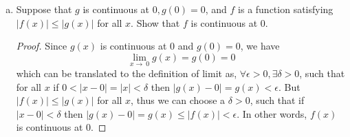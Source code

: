 \documentclass[10pt,letterpaper]{article}
\begin{document}
\begin{enumerate}[(a)]
	\item Suppose that $g$ is continuous at $0, g(0) = 0$, and $f$ is a function satisfying 
	$|f(x)| \leq |g(x)|$ for all $x$. Show that $f$ is continuous at $0$. 
	\begin{proof}
		Since $g(x)$ is continuous at $0$ and $g(0) = 0$, we have
		$$\displaystyle\lim_{x\to\ 0}g(x) = g(0) = 0$$
		which can be translated to the definition of limit as,
		$\forall \epsilon > 0, \exists \delta > 0$, such that for all $x$ if $0 < |x - 0| = |x| < \delta$
		then $|g(x) - 0| = g(x) < \epsilon$. But $|f(x)| \leq |g(x)|$ for all $x$, thus we can choose 
		a $\delta > 0$, such that if $|x - 0| < \delta$ then $|g(x) - 0| = g(x) \leq |f(x)| < \epsilon$.
		In other words, $f(x)$ is continuous at $0$. 
	\end{proof}
	\end{enumerate}
	
	\newpage
\end{document}
